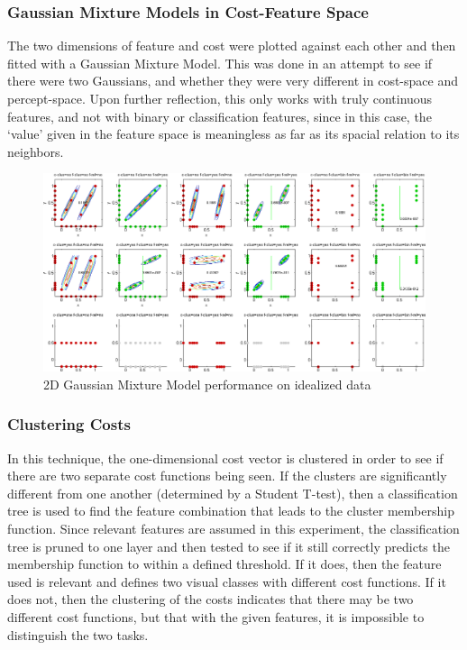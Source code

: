 \documentclass[12pt]{article}
\begin{document}
\subsubsection{Gaussian Mixture Models in Cost-Feature Space}



The two dimensions of feature and cost were plotted against each other and then fitted with a Gaussian Mixture Model. This was done in an attempt to see if there were two Gaussians, and whether they were very different in cost-space and percept-space. Upon further reflection, this only works with truly continuous features, and not with binary or classification features, since in this case, the `value' given in the feature space is meaningless as far as its spacial relation to its neighbors.

\begin{figure}[ht]
  \centerline{
  \includegraphics[width=1.0\columnwidth]{2d_gaussians.png}}
  \caption{\label{fig_2d_gaussians} 2D Gaussian Mixture Model performance on idealized data}
  \label{fig:2Dgaussians}
\end{figure}


\subsubsection{Clustering Costs}

In this technique, the one-dimensional cost vector is clustered in order to see if there are two separate cost functions being seen. If the clusters are significantly different from one another (determined by a Student T-test), then a classification tree is used to find the feature combination that leads to the cluster membership function. Since relevant features are assumed in this experiment, the classification tree is pruned to one layer and then tested to see if it still correctly predicts the membership function to within a defined threshold. If it does, then the feature used is relevant and defines two visual classes with different cost functions. If it does not, then the clustering of the costs indicates that there may be two different cost functions, but that with the given features, it is impossible to distinguish the two tasks. 
\end{document}
